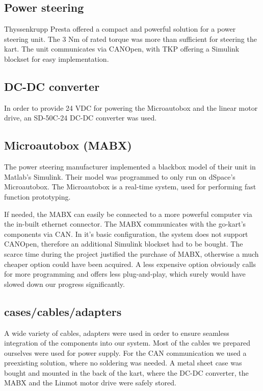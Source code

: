 \subsection{Power steering}
Thyssenkrupp Presta offered a compact and powerful solution for a power steering unit. The 3 Nm of rated torque was more than sufficient for steering the kart. The unit communicates via CANOpen, with TKP offering a Simulink blockset for easy implementation. 

\subsection{DC-DC converter}
In order to provide 24 VDC for powering the Microautobox and the linear motor drive, an SD-50C-24 DC-DC converter was used.

\subsection{Microautobox (MABX)}
The power steering manufacturer implemented a blackbox model of their unit in Matlab's Simulink. Their model was programmed to only run on dSpace's Microautobox. The Microautobox is a real-time system, used for performing fast function prototyping.

If needed, the MABX can easily be connected to a more powerful computer via the in-built ethernet connector. The MABX communicates with the go-kart's components via CAN. In it's basic configuration, the system does not support CANOpen, therefore an additional Simulink blockset had to be bought. The scarce time during the project justified the purchase of MABX, otherwise a much cheaper option could have been acquired. A less expensive option obviously calls for more programming and offers less plug-and-play, which surely would have slowed down our progress significantly. 

\subsection{cases/cables/adapters}
A wide variety of cables, adapters were used in order to ensure seamless integration of the components into our system.
Most of the cables we prepared ourselves were used for power supply.
For the CAN communication we used a preexisting solution, where no soldering was needed.
A metal sheet case was bought and mounted in the back of the kart, where the DC-DC converter, the MABX and the Linmot motor drive were safely stored.